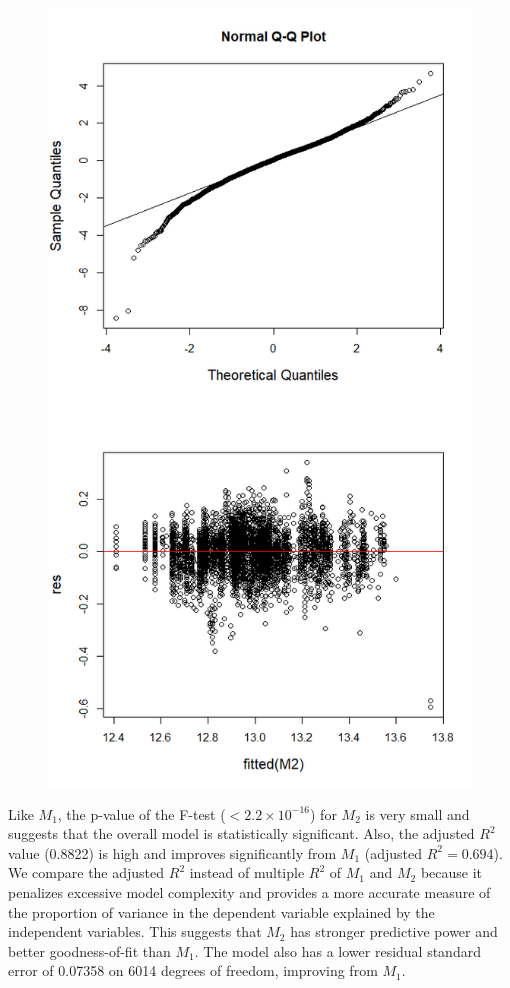 \begin{figure}[!htp]
\begin{minipage}[t]{0.37\textwidth}
  \includegraphics[width=\textwidth]{images2/m2updated.png}
  \label{fig: m2 assumption check}
\end{minipage}
\end{figure}
Like $M_1$, the p-value of the F-test ($<2.2 \times 10^{-16}$) for $M_2$ is very small and suggests that the overall model is statistically significant. Also, the adjusted $R^2$ value (0.8822) is high and improves significantly from $M_1$ (adjusted $R^2 = 0.694$). We compare the adjusted $R^2$ instead of multiple $R^2$ of $M_1$ and $M_2$ because it penalizes excessive model complexity and provides a more accurate measure of the proportion of variance in the dependent variable explained by the independent variables. This suggests that $M_2$ has stronger predictive power and better goodness-of-fit than $M_1$. The model also has a lower residual standard error of 0.07358 on 6014 degrees of freedom, improving from $M_1$.

